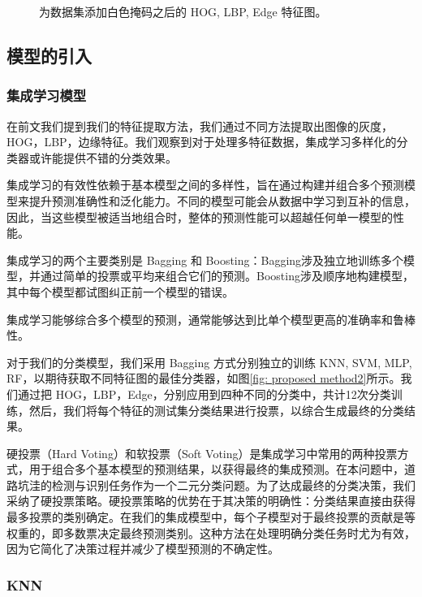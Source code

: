 \documentclass[a4paper, 10pt]{article}
\begin{document}
\begin{figure}[htbp]
		\caption{
			\label{fig: alldata filled}
			为数据集添加白色掩码之后的 HOG, LBP, Edge 特征图。
		}
	\end{figure}
	
	\subsection{模型的引入}
	
	\subsubsection{集成学习模型}
	
	在前文我们提到我们的特征提取方法，我们通过不同方法提取出图像的灰度，HOG，LBP，边缘特征。我们观察到对于处理多特征数据，集成学习多样化的分类器或许能提供不错的分类效果。
	
	集成学习的有效性依赖于基本模型之间的多样性，旨在通过构建并组合多个预测模型来提升预测准确性和泛化能力。不同的模型可能会从数据中学习到互补的信息，因此，当这些模型被适当地组合时，整体的预测性能可以超越任何单一模型的性能。
	
	集成学习的两个主要类别是 Bagging 和 Boosting：Bagging涉及独立地训练多个模型，并通过简单的投票或平均来组合它们的预测。Boosting涉及顺序地构建模型，其中每个模型都试图纠正前一个模型的错误。
	
	集成学习能够综合多个模型的预测，通常能够达到比单个模型更高的准确率和鲁棒性。

	对于我们的分类模型，我们采用 Bagging 方式分别独立的训练 KNN, SVM, MLP, RF，以期待获取不同特征图的最佳分类器，如图\ref{fig: proposed method2}所示。我们通过把 HOG，LBP，Edge，分别应用到四种不同的分类中，共计12次分类训练，然后，我们将每个特征的测试集分类结果进行投票，以综合生成最终的分类结果。
	
	硬投票（Hard Voting）和软投票（Soft Voting）是集成学习中常用的两种投票方式，用于组合多个基本模型的预测结果，以获得最终的集成预测。在本问题中，道路坑洼的检测与识别任务作为一个二元分类问题。为了达成最终的分类决策，我们采纳了硬投票策略。硬投票策略的优势在于其决策的明确性：分类结果直接由获得最多投票的类别确定。在我们的集成模型中，每个子模型对于最终投票的贡献是等权重的，即多数票决定最终预测类别。这种方法在处理明确分类任务时尤为有效，因为它简化了决策过程并减少了模型预测的不确定性。
	
	
	
	\subsubsection{KNN}
	
\end{document}
